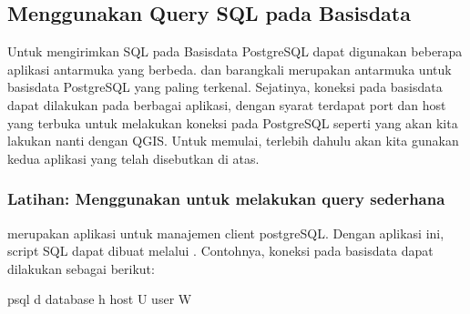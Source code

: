 \documentclass[letterpaper,10pt,english]{sphinxmanual}
\begin{document}
\subsection{Menggunakan Query SQL pada Basisdata}
\label{\detokenize{sesi2/relationaldb:menggunakan-query-sql-pada-basisdata}}
Untuk mengirimkan SQL pada Basisdata PostgreSQL dapat digunakan beberapa aplikasi antarmuka yang berbeda.  dan  barangkali merupakan antarmuka untuk basisdata PostgreSQL yang paling terkenal. Sejatinya, koneksi pada basisdata dapat dilakukan pada berbagai aplikasi, dengan syarat terdapat port dan host yang terbuka untuk melakukan koneksi pada PostgreSQL seperti yang akan kita lakukan nanti dengan QGIS. Untuk memulai, terlebih dahulu akan kita gunakan kedua aplikasi yang telah disebutkan di atas.


\subsubsection{Latihan: Menggunakan  untuk melakukan query sederhana}
\label{\detokenize{sesi2/relationaldb:latihan-menggunakan-psql-untuk-melakukan-query-sederhana}}
 merupakan aplikasi untuk manajemen client postgreSQL. Dengan aplikasi ini, script SQL dapat dibuat melalui . Contohnya, koneksi pada basisdata dapat dilakukan sebagai berikut:

\begin{sphinxVerbatim}[commandchars=\\\{\}]
psql \PYGZhy{}d database \PYGZhy{}h host \PYGZhy{}U  user \PYGZhy{}W
\end{sphinxVerbatim}
\end{document}
